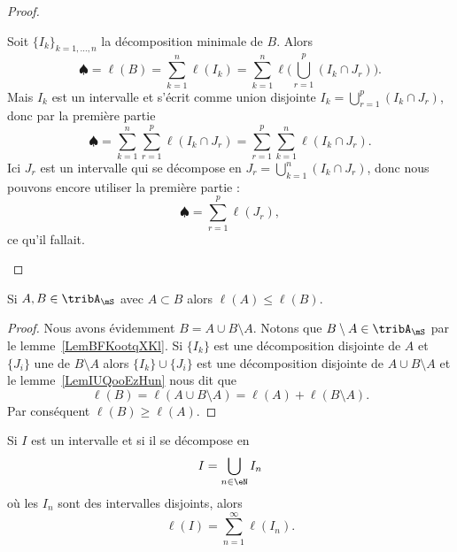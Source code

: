 \begin{proof}
\begin{subproof}
		Soit \( \{ I_k \}_{k=1,\ldots, n}\) la décomposition minimale de \( B\). Alors
		\begin{equation}
			\spadesuit=\ell(B)=\sum_{k=1}^n\ell(I_k)=\sum_{k=1}^n\ell\big( \bigcup_{r=1}^p(I_k\cap J_r) \big).
		\end{equation}
		Mais \( I_k\) est un intervalle et s'écrit comme union disjointe \( I_k=\bigcup_{r=1}^p(I_k\cap J_r)\), donc par la première partie
		\begin{equation}
			\spadesuit=\sum_{k=1}^n\sum_{r=1}^p\ell(I_k\cap J_r)=\sum_{r=1}^p\sum_{k=1}^n\ell(I_k\cap J_r).
		\end{equation}
		Ici \( J_r\) est un intervalle qui se décompose en \( J_r=\bigcup_{k=1}^n(I_k\cap J_r)\), donc nous pouvons encore utiliser la première partie :
		\begin{equation}
			\spadesuit=\sum_{r=1}^p\ell(J_r),
		\end{equation}
		ce qu'il fallait.
	\end{subproof}
\end{proof}

\begin{lemma}   \label{LemPIOooRLkbo}
	Si \( A,B\in\tribA_{\mS}\) avec \( A\subset B\) alors \( \ell(A)\leq \ell(B)\).
\end{lemma}

\begin{proof}
	Nous avons évidemment \( B=A\cup B\setminus A\). Notons que \( B\setminus A\in\tribA_{\mS}\) par le lemme~\ref{LemBFKootqXKl}. Si \( \{ I_k \}\) est une décomposition disjointe de \( A\) et \( \{ J_i \}\) une de \( B\setminus A\) alors \( \{ I_k \}\cup\{ J_i \}\) est une décomposition disjointe de \( A\cup B\setminus A\) et le lemme~\ref{LemIUQooEzHun} nous dit que
	\begin{equation}
		\ell(B)=\ell(A\cup B\setminus A)=\ell(A)+\ell(B\setminus A).
	\end{equation}
	Par conséquent \( \ell(B)\geq \ell(A)\).
\end{proof}

\begin{lemma}   \label{LemUMVooZJgMu}
	Si \( I\) est un intervalle et si il se décompose en
	\begin{equation}
		I=\bigcup_{n\in \eN}I_n
	\end{equation}
	où les \( I_n\) sont des intervalles disjoints, alors
	\begin{equation}
		\ell(I)=\sum_{n=1}^{\infty}\ell(I_n).
	\end{equation}
\end{lemma}

